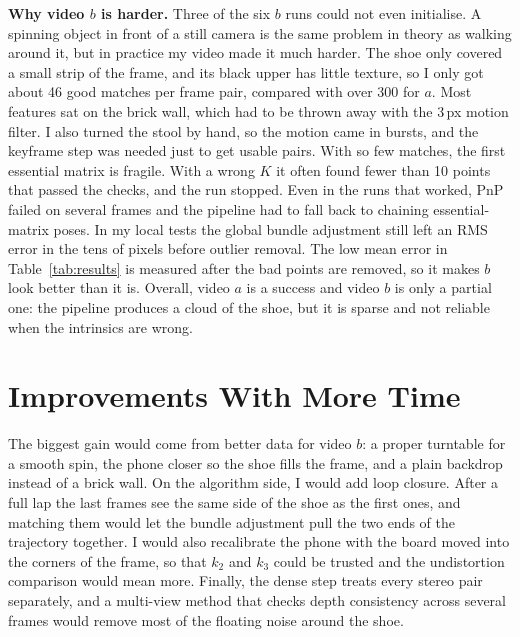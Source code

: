\documentclass[conference]{assets/latex/IEEEtran}
\begin{document}
\textbf{Why video $b$ is harder.} Three of the six $b$ runs could not even initialise. A
spinning object in front of a still camera is the same problem in theory as walking around it,
but in practice my video made it much harder. The shoe only covered a small strip of the frame,
and its black upper has little texture, so I only got about 46 good matches per frame pair,
compared with over 300 for $a$. Most features sat on the brick wall, which had to be thrown away
with the 3\,px motion filter. I also turned the stool by hand, so the motion came in bursts, and
the keyframe step was needed just to get usable pairs. With so few matches, the first essential
matrix is fragile. With a wrong $K$ it often found fewer than 10 points that passed the checks,
and the run stopped. Even in the runs that worked, PnP failed on several frames and the
pipeline had to fall back to chaining essential-matrix poses. In my local tests the global bundle
adjustment still left an RMS error in the tens of pixels before outlier removal. The low mean
error in Table~\ref{tab:results} is measured after the bad points are removed, so it makes $b$
look better than it is. Overall, video $a$ is a success and video $b$ is only a partial one: the
pipeline produces a cloud of the shoe, but it is sparse and not reliable when the intrinsics are
wrong.

\section{Improvements With More Time}

The biggest gain would come from better data for video $b$: a proper turntable for a smooth spin,
the phone closer so the shoe fills the frame, and a plain backdrop instead of a brick wall. On
the algorithm side, I would add loop closure. After a full lap the last frames see the same side
of the shoe as the first ones, and matching them would let the bundle adjustment pull the two
ends of the trajectory together. I would also recalibrate the phone with the board moved into
the corners of the frame, so that $k_2$ and $k_3$ could be trusted and the undistortion
comparison would mean more. Finally, the dense step treats every stereo pair separately, and a
multi-view method that checks depth consistency across several frames would remove most of the
floating noise around the shoe.

\nocite{foundationsCVbook}
\printbibliography
\end{document}
